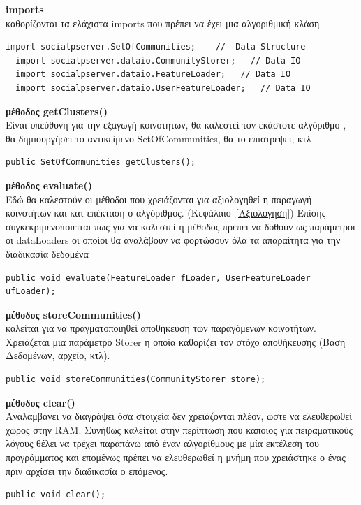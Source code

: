 \begin{description}
\item \textbf{imports}  \hfill \\
  καθορίζονται τα ελάχιστα imports που πρέπει να έχει μια αλγοριθμική κλάση. 
\begin{lstlisting}[frame=single] 
  import socialpserver.SetOfCommunities;    //  Data Structure
  import socialpserver.dataio.CommunityStorer;   // Data IO
  import socialpserver.dataio.FeatureLoader;   // Data IO
  import socialpserver.dataio.UserFeatureLoader;   // Data IO
\end{lstlisting}
\item \textbf{μέθοδος getClusters()}  \hfill \\
  Είναι υπεύθυνη για την εξαγωγή κοινοτήτων, θα καλεστεί τον εκάστοτε αλγόριθμο , θα δημιουργήσει το αντικείμενο SetOfCommunities, θα το επιστρέψει, κτλ     
\begin{lstlisting}[frame=single]
  public SetOfCommunities getClusters();
\end{lstlisting}
\item \textbf{μέθοδος evaluate()}   \hfill \\
  Εδώ θα καλεστούν οι μέθοδοι που χρειάζονται για αξιολογηθεί η παραγωγή κοινοτήτων και κατ επέκταση ο αλγόριθμος. (Κεφάλαιο~\ref{Αξιολόγηση})
  Επίσης συγκεκριμενοποιείται πως για να καλεστεί η μέθοδος πρέπει να δοθούν ως παράμετροι οι dataLoaders οι οποίοι θα αναλάβουν να φορτώσουν όλα τα απαραίτητα για την διαδικασία δεδομένα  
\begin{lstlisting}[frame=single]
   public void evaluate(FeatureLoader fLoader, UserFeatureLoader ufLoader);
\end{lstlisting}
\item \textbf{μέθοδος storeCommunities()}   \hfill \\
καλείται για να πραγματοποιηθεί αποθήκευση των παραγόμενων κοινοτήτων. Χρειάζεται μια παράμετρο Storer η οποία καθορίζει τον στόχο αποθήκευσης (Βάση Δεδομένων, αρχείο, κτλ).
\begin{lstlisting}[frame=single]
  public void storeCommunities(CommunityStorer store);   
\end{lstlisting}
\item \textbf{μέθοδος clear()}\hfill \\
Αναλαμβάνει να διαγράψει όσα στοιχεία δεν χρειάζονται πλέον, ώστε να ελευθερωθεί χώρος στην RAM. Συνήθως καλείται στην περίπτωση που κάποιος
για πειραματικούς λόγους θέλει να τρέχει παραπάνω από έναν αλγορίθμους με μία εκτέλεση του προγράμματος και επομένως πρέπει να ελευθερωθεί η μνήμη που χρειάστηκε
ο ένας πριν αρχίσει την διαδικασία ο επόμενος.
\begin{lstlisting}[frame=single]
  public void clear();    
\end{lstlisting}  
\end{description}

